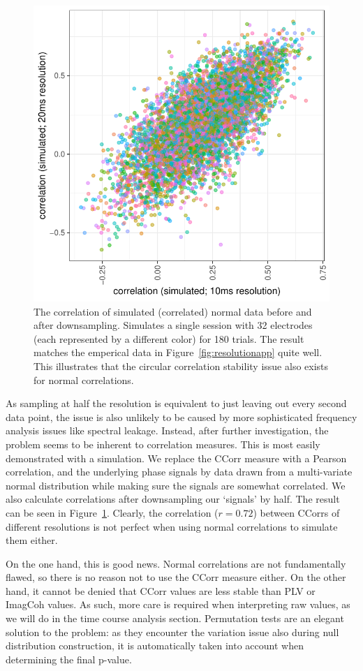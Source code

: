 \begin{figure}[!htpb]
  \includegraphics[width=\linewidth]{../stats/results/corsimulation.pdf}
  \caption{The correlation of simulated (correlated) normal data before and after downsampling. Simulates a single session with 32 electrodes (each represented by a different color) for 180 trials. The result matches the emperical data in Figure~\ref{fig:resolutionapp} quite well. This illustrates that the circular correlation stability issue also exists for normal correlations.}
  \label{fig:corsimulation}
\end{figure}

As sampling at half the resolution is equivalent to just leaving out every
second data point, the issue is also unlikely to be caused by more sophisticated
frequency analysis issues like spectral leakage. Instead, after further
investigation, the problem seems to be inherent to correlation measures. This is
most easily demonstrated with a simulation. We replace the CCorr measure with a
Pearson correlation, and the underlying phase signals by data drawn from a
multi-variate normal distribution while making sure the signals are somewhat
correlated. We also calculate correlations after downsampling our `signals' by
half. The result can be seen in Figure~\ref{fig:corsimulation}. Clearly, the
correlation ($r=0.72$) between CCorrs of different resolutions is not perfect
when using normal correlations to simulate them either.

On the one hand, this is good news. Normal correlations are not fundamentally
flawed, so there is no reason not to use the CCorr measure either. On the other
hand, it cannot be denied that CCorr values are less stable than PLV or ImagCoh
values. As such, more care is required when interpreting raw values, as we will
do in the time course analysis section. Permutation tests are an elegant
solution to the problem: as they encounter the variation issue also during null
distribution construction, it is automatically taken into account when
determining the final p-value.
